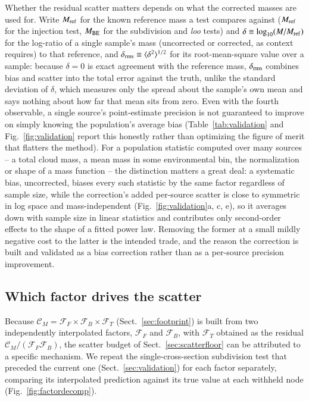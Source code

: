 \documentclass{aa}
\newcommand{\CM}{\mathcal{C}_{M}}
\newcommand{\Fflux}{\mathcal{F}_{F}}
\newcommand{\Ftemp}{\mathcal{F}_{T}}
\newcommand{\Fbg}{\mathcal{F}_{B}}
\newcommand{\Mbe}{M_{\rm BE}}
\newcommand{\Mref}{M_{\rm ref}}
\begin{document}
Whether the residual scatter matters depends on what the corrected masses
are used for. Write $\Mref$ for the known reference mass a test
compares against ($\Mref$ for the injection test, $\Mbe$ for
the subdivision and \emph{loo} tests) and $\delta \equiv \log_{10}(M/\Mref)$
for the log-ratio of a single sample's mass (uncorrected or corrected, as
context requires) to that reference, and
$\delta_{\rm rms}\equiv\langle\delta^2\rangle^{1/2}$ for its root-mean-square
value over a sample: because $\delta=0$ is exact agreement with the
reference mass, $\delta_{\rm rms}$ combines bias and scatter into the
total error against the truth, unlike the standard deviation of $\delta$,
which measures only the spread about the sample's own mean and says
nothing about how far that mean sits from zero. Even with the fourth
observable, a single source's point-estimate precision is not
guaranteed to improve on simply knowing the population's average bias
(Table~\ref{tab:validation} and Fig.~\ref{fig:validation} report this
honestly rather than optimizing the figure of merit that flatters the
method). For a population statistic computed over many sources -- a total
cloud mass, a mean mass in some environmental bin, the normalization or
shape of a mass function -- the distinction matters a great deal: a
systematic bias, uncorrected, biases every such statistic by the same
factor regardless of sample size, while the correction's added per-source
scatter is close to symmetric in log space and mass-independent
(Fig.~\ref{fig:validation}a, c, e), so it averages down with sample size
in linear statistics and contributes only second-order effects to the
shape of a fitted power law. Removing the
former at a small mildly negative cost to the latter is the intended
trade, and the reason the correction is built and validated as a bias
correction rather than as a per-source precision improvement.

\subsection{Which factor drives the scatter}
\label{sec:factorscatter}

Because $\CM=\Fflux\times \Fbg\times \Ftemp$
(Sect.~\ref{sec:footprint}) is built from two independently interpolated
factors, $\Fflux$ and $\Fbg$, with $\Ftemp$ obtained as
the residual $\CM/(\Fflux\Fbg)$, the scatter budget of
Sect.~\ref{sec:scatterfloor} can be attributed to a specific mechanism. We
repeat the single-cross-section subdivision test that preceded the
current one (Sect.~\ref{sec:validation}) for each factor separately,
comparing its interpolated prediction against its true value at each
withheld node (Fig.~\ref{fig:factordecomp}).
\end{document}
